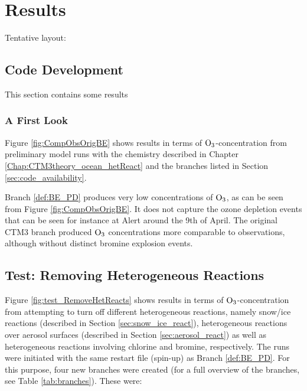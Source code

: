 \setcounter{chapter}{5}
\chapter{Results}

Tentative layout: 


\section{Code Development}\label{sec:results_code_development}

This section contains some results 


\subsection{A First Look}

Figure \ref{fig:CompObsOrigBE} shows results in terms of $\mathrm{O_3}$-concentration from preliminary model runs with the chemistry described in Chapter \ref{Chap:CTM3theory_ocean_hetReact} and the branches listed in Section \ref{sec:code_availability}. 

\medskip

Branch \ref{def:BE_PD} produces very low concentrations of $\mathrm{O_3}$, as can be seen from Figure \ref{fig:CompObsOrigBE}. It does not capture the ozone depletion events that can be seen for instance at Alert around the 9th of April. The original CTM3 branch produced $\mathrm{O_3}$ concentrations more comparable to observations, although without distinct bromine explosion events. 




\section{Test: Removing Heterogeneous Reactions}

Figure \ref{fig:test_RemoveHetReacts} shows results in terms of $\mathrm{O_3}$-concentration from attempting to turn off different heterogeneous reactions, namely snow/ice reactions (described in Section \ref{sec:snow_ice_react}), heterogeneous reactions over aerosol surfaces (described in Section \ref{sec:aerosol_react}) as well as heterogeneous reactions involving chlorine and bromine, respectively. The runs were initiated with the same restart file (spin-up) as Branch \ref{def:BE_PD}. For this purpose, four new branches were created (for a full overview of the branches, see Table \ref{tab:branches}). These were:

